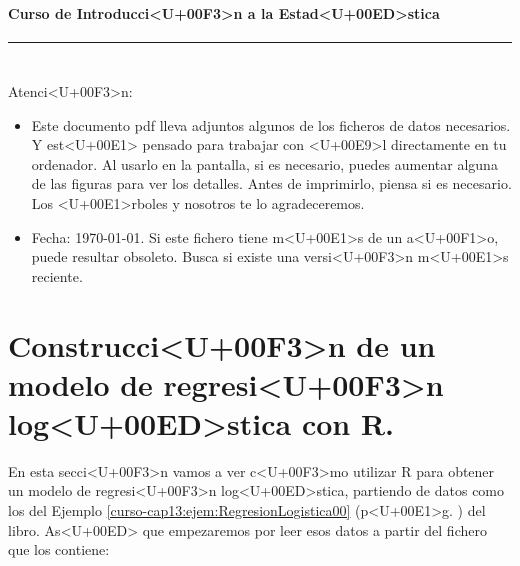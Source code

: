\documentclass[10pt,a4paper]{article}
\newcounter {cont01}
\begin{document}

\paragraph{\hspace{6.3cm}Curso de Introducci<U+00F3>n a la Estad<U+00ED>stica\\[2mm]} \noindent\hrule

\setcounter{section}{0}
\section*{\hspace{-0.1cm}} Atenci<U+00F3>n:
\begin{itemize}
  \item Este documento pdf lleva adjuntos algunos de los ficheros de datos necesarios. Y est<U+00E1>
      pensado para trabajar con <U+00E9>l directamente en tu ordenador. Al usarlo en la pantalla, si es
      necesario, puedes aumentar alguna de las figuras para ver los detalles. Antes de
      imprimirlo, piensa si es necesario. Los <U+00E1>rboles y nosotros te lo agradeceremos.
  \item Fecha: \today. Si este fichero tiene m<U+00E1>s de un a<U+00F1>o, puede resultar obsoleto. Busca si
      existe una versi<U+00F3>n m<U+00E1>s reciente.
\end{itemize}
\setcounter{tocdepth}{1}
\tableofcontents

\section{Construcci<U+00F3>n de un modelo de regresi<U+00F3>n log<U+00ED>stica con R.}

En esta secci<U+00F3>n vamos a  ver c<U+00F3>mo utilizar R para obtener un modelo de regresi<U+00F3>n log<U+00ED>stica, partiendo de datos como los del Ejemplo \ref{curso-cap13:ejem:RegresionLogistica00} (p<U+00E1>g. \pageref{curso-cap13:ejem:RegresionLogistica00}) del libro. As<U+00ED> que empezaremos por leer esos datos a partir del fichero que los contiene:
\end{document}
